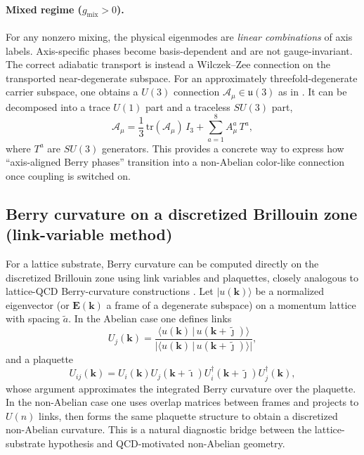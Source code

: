 \paragraph{Mixed regime ($g_{\mathrm{mix}}>0$).}
For any nonzero mixing, the physical eigenmodes are \emph{linear combinations} of axis labels.
Axis-specific phases become basis-dependent and are not gauge-invariant.
The correct adiabatic transport is instead a Wilczek--Zee connection on the transported near-degenerate subspace.
For an approximately threefold-degenerate carrier subspace, one obtains a $U(3)$ connection
$\mathcal{A}_\mu\in\mathfrak{u}(3)$ as in .
It can be decomposed into a trace $U(1)$ part and a traceless $SU(3)$ part,
\begin{equation}
  \mathcal{A}_\mu
  = \frac{1}{3}\,\mathrm{tr}(\mathcal{A}_\mu)\,I_3
  + \sum_{a=1}^{8} A^a_\mu\,T^a,
\end{equation}
where $T^a$ are $SU(3)$ generators.
This provides a concrete way to express how ``axis-aligned Berry phases'' transition into a non-Abelian color-like
connection once coupling is switched on.

\subsection{Berry curvature on a discretized Brillouin zone (link-variable method)}
\label{subsec:bz-berry}

For a lattice substrate, Berry curvature can be computed directly on the discretized Brillouin zone using
link variables and plaquettes, closely analogous to lattice-QCD Berry-curvature constructions
\citep{Fukui2005ChernDiscretizedBZ,PuYamamoto2018BerryLatticeQCD,Yamamoto2016BerryPhaseLatticeQCD}.
Let $\lvert u(\mathbf{k})\rangle$ be a normalized eigenvector (or $\mathbf{E}(\mathbf{k})$ a frame of a degenerate
subspace) on a momentum lattice with spacing $\tilde a$.
In the Abelian case one defines links
\begin{equation}
  U_j(\mathbf{k})=\frac{\langle u(\mathbf{k})\,|\,u(\mathbf{k}+\tilde{\jmath})\rangle}
  {|\langle u(\mathbf{k})\,|\,u(\mathbf{k}+\tilde{\jmath})\rangle|},
\end{equation}
and a plaquette
\begin{equation}
  U_{ij}(\mathbf{k}) = U_i(\mathbf{k})U_j(\mathbf{k}+\tilde{\imath})
  U_i^\dagger(\mathbf{k}+\tilde{\jmath})U_j^\dagger(\mathbf{k}),
\end{equation}
whose argument approximates the integrated Berry curvature over the plaquette.
In the non-Abelian case one uses overlap matrices between frames and projects to $U(n)$ links, then forms the same
plaquette structure to obtain a discretized non-Abelian curvature.
This is a natural diagnostic bridge between the lattice-substrate hypothesis and QCD-motivated non-Abelian geometry.
